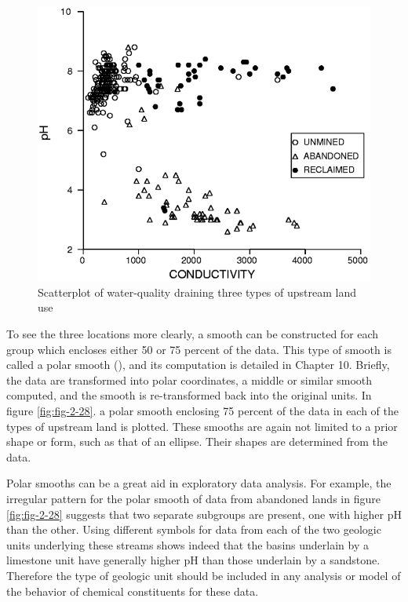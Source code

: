 \documentclass[]{book}
\begin{document}
\begin{figure}

{\centering \includegraphics[width=11.67in]{figures/2_27} 

}

\caption{Scatterplot of water-quality draining three types of upstream land use}\label{fig:fig-2-27}
\end{figure}

To see the three locations more clearly, a smooth can be constructed for each group which encloses either 50 or 75 percent of the data. This type of smooth is called a polar smooth (\citet{cleveland_many_1984}), and its computation is detailed in Chapter 10. Briefly, the data are transformed into polar coordinates, a middle or similar smooth computed, and the smooth is re-transformed back into the original units. In figure \ref{fig:fig-2-28}. a polar smooth enclosing 75 percent of the data in each of the types of upstream land is plotted. These smooths are again not limited to a prior shape or form, such as that of an ellipse. Their shapes are determined from the data.

Polar smooths can be a great aid in exploratory data analysis. For example, the irregular pattern for the polar smooth of data from abandoned lands in figure \ref{fig:fig-2-28} suggests that two separate subgroups are present, one with higher pH than the other. Using different symbols for data from each of the two geologic units underlying these streams shows indeed that the basins underlain by a limestone unit have generally higher pH than those underlain by a sandstone. Therefore the type of geologic unit should be included in any analysis or model of the behavior of chemical constituents for these data.
\end{document}
